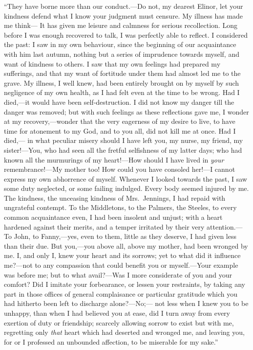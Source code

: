 ``They have borne more than our conduct.---Do not,
my dearest Elinor, let your kindness defend what I know
your judgment must censure.  My illness has made me think---%
It has given me leisure and calmness for serious recollection.
Long before I was enough recovered to talk, I was perfectly
able to reflect.  I considered the past: I saw in my
own behaviour, since the beginning of our acquaintance
with him last autumn, nothing but a series of imprudence
towards myself, and want of kindness to others.
I saw that my own feelings had prepared my sufferings,
and that my want of fortitude under them had almost led
me to the grave.  My illness, I well knew, had been
entirely brought on by myself by such negligence of my
own health, as I had felt even at the time to be wrong.
Had I died,---it would have been self-destruction. I
did not know my danger till the danger was removed;
but with such feelings as these reflections gave me,
I wonder at my recovery,---wonder that the very eagerness
of my desire to live, to have time for atonement to my God,
and to you all, did not kill me at once.  Had I died,---%
in what peculiar misery should I have left you, my nurse,
my friend, my sister!---You, who had seen all the fretful
selfishness of my latter days; who had known all the
murmurings of my heart!---How should I have lived in \emph{your}
remembrance!---My mother too! How could you have consoled
her!---I cannot express my own abhorrence of myself.
Whenever I looked towards the past, I saw some duty neglected,
or some failing indulged.  Every body seemed injured by me.
The kindness, the unceasing kindness of Mrs.\ Jennings,
I had repaid with ungrateful contempt.  To the Middletons,
to the Palmers, the Steeles, to every common acquaintance even,
I had been insolent and unjust; with a heart hardened
against their merits, and a temper irritated by their
very attention.---To John, to Fanny,---yes, even to them,
little as they deserve, I had given less than their due.
But you,---you above all, above my mother, had been wronged
by me.  I, and only I, knew your heart and its sorrows;
yet to what did it influence me?---not to any compassion
that could benefit you or myself.---Your example was
before me; but to what avail?---Was I more considerate
of you and your comfort?  Did I imitate your forbearance,
or lessen your restraints, by taking any part in those
offices of general complaisance or particular gratitude
which you had hitherto been left to discharge alone?---No;---%
not less when I knew you to be unhappy, than when I
had believed you at ease, did I turn away from every
exertion of duty or friendship; scarcely allowing sorrow
to exist but with me, regretting only \emph{that} heart
which had deserted and wronged me, and leaving you,
for or I professed an unbounded affection, to be miserable
for my sake.''

